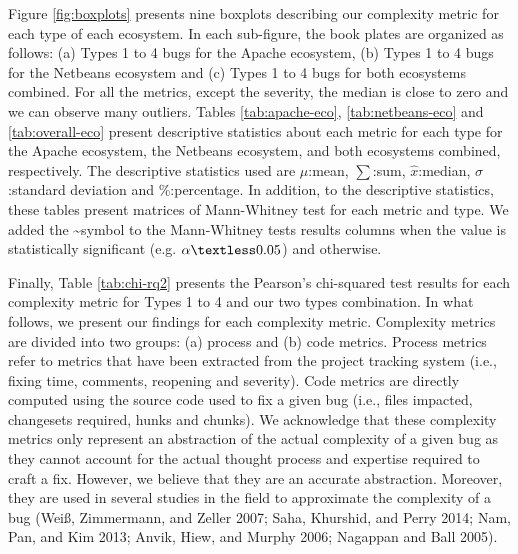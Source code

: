 \documentclass[natbib]{svjour3}
\newcommand{\xmark}{\ding{55}}%
\begin{document}
Figure \ref{fig:boxplots} presents nine boxplots describing our
complexity metric for each type of each ecosystem. In each sub-figure,
the book plates are organized as follows: (a) Types 1 to 4 bugs for the
Apache ecosystem, (b) Types 1 to 4 bugs for the Netbeans ecosystem and
(c) Types 1 to 4 bugs for both ecosystems combined. For all the metrics,
except the severity, the median is close to zero and we can observe many
outliers. Tables \ref{tab:apache-eco}, \ref{tab:netbeans-eco} and
\ref{tab:overall-eco} present descriptive statistics about each metric
for each type for the Apache ecosystem, the Netbeans ecosystem, and both
ecosystems combined, respectively. The descriptive statistics used are
\(\mu\):mean, \(\sum\):sum, \(\hat{x}\):median, \(\sigma\):standard
deviation and \(\%\):percentage. In addition, to the descriptive
statistics, these tables present matrices of Mann-Whitney test for each
metric and type. We added the \checkmark\textasciitilde{}symbol to the
Mann-Whitney tests results columns when the value is statistically
significant (e.g. \(\alpha \textless 0.05\)) and \xmark otherwise.

Finally, Table \ref{tab:chi-rq2} presents the Pearson's chi-squared test
results for each complexity metric for Types 1 to 4 and our two types
combination. In what follows, we present our findings for each
complexity metric. Complexity metrics are divided into two groups: (a)
process and (b) code metrics. Process metrics refer to metrics that have
been extracted from the project tracking system (i.e., fixing time,
comments, reopening and severity). Code metrics are directly computed
using the source code used to fix a given bug (i.e., files impacted,
changesets required, hunks and chunks). We acknowledge that these
complexity metrics only represent an abstraction of the actual
complexity of a given bug as they cannot account for the actual thought
process and expertise required to craft a fix. However, we believe that
they are an accurate abstraction. Moreover, they are used in several
studies in the field to approximate the complexity of a bug (Weiß,
Zimmermann, and Zeller 2007; Saha, Khurshid, and Perry 2014; Nam, Pan,
and Kim 2013; Anvik, Hiew, and Murphy 2006; Nagappan and Ball 2005).
\end{document}
